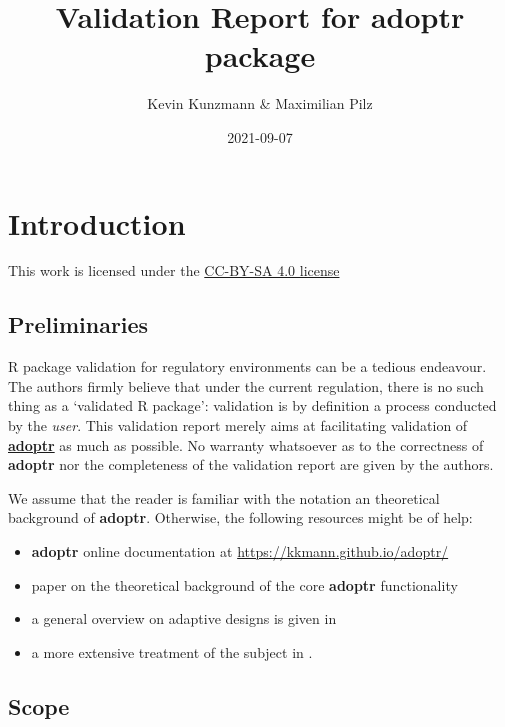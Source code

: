 \documentclass[
]{book}
\title{Validation Report for \textbf{adoptr} package}
\author{Kevin Kunzmann \& Maximilian Pilz}
\date{2021-09-07}
\providecommand{\tightlist}{%
  \setlength{\itemsep}{0pt}\setlength{\parskip}{0pt}}
\begin{document}
\maketitle

{
\setcounter{tocdepth}{1}
\tableofcontents
}
\hypertarget{introduction}{%
\chapter{Introduction}\label{introduction}}

This work is licensed under the \href{https://creativecommons.org/licenses/by-sa/4.0/deed.en}{CC-BY-SA 4.0 license}

\hypertarget{preliminaries}{%
\section{Preliminaries}\label{preliminaries}}

R package validation for regulatory environments can be a
tedious endeavour.
The authors firmly believe that under the current regulation,
there is no such thing as a `validated R package':
validation is by definition a process conducted by the \emph{user}.
This validation report merely aims at facilitating
validation of \textbf{\href{https://github.com/kkmann/adoptr}{adoptr}} as
much as possible.
No warranty whatsoever as to the correctness of \textbf{adoptr} nor the
completeness of the validation report are given by the authors.

We assume that the reader is familiar with the notation an theoretical
background of \textbf{adoptr}.
Otherwise, the following resources might be of help:

\begin{itemize}
\tightlist
\item
  \textbf{adoptr} online documentation at \url{https://kkmann.github.io/adoptr/}
\item
  paper on the theoretical background of the core \textbf{adoptr} functionality \citep{variational}
\item
  a general overview on adaptive designs is given in \citep{Bauer2015}
\item
  a more extensive treatment of the subject in \citep{Wassmer2016}.
\end{itemize}

\hypertarget{scope}{%
\section{Scope}\label{scope}}
\end{document}
